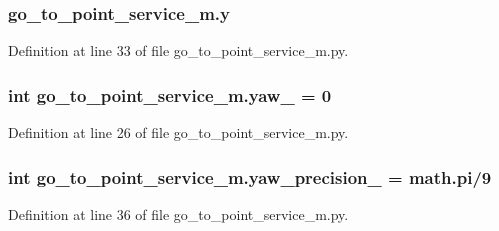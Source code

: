 \subsubsection[{\texorpdfstring{y}{y}}]{\setlength{\rightskip}{0pt plus 5cm}go\+\_\+to\+\_\+point\+\_\+service\+\_\+m.\+y}\hypertarget{namespacego__to__point__service__m_a8a0df04be6cfa44113ee26eefbe11f95}{}\label{namespacego__to__point__service__m_a8a0df04be6cfa44113ee26eefbe11f95}


Definition at line 33 of file go\+\_\+to\+\_\+point\+\_\+service\+\_\+m.\+py.

\subsubsection[{\texorpdfstring{yaw\+\_\+}{yaw_}}]{\setlength{\rightskip}{0pt plus 5cm}int go\+\_\+to\+\_\+point\+\_\+service\+\_\+m.\+yaw\+\_\+ = 0}\hypertarget{namespacego__to__point__service__m_ab1e499009bca0d4c9ea5e8954aa37797}{}\label{namespacego__to__point__service__m_ab1e499009bca0d4c9ea5e8954aa37797}


Definition at line 26 of file go\+\_\+to\+\_\+point\+\_\+service\+\_\+m.\+py.

\subsubsection[{\texorpdfstring{yaw\+\_\+precision\+\_\+}{yaw_precision_}}]{\setlength{\rightskip}{0pt plus 5cm}int go\+\_\+to\+\_\+point\+\_\+service\+\_\+m.\+yaw\+\_\+precision\+\_\+ = math.\+pi/9}\hypertarget{namespacego__to__point__service__m_af47f1354626111fc63115c06276ae41d}{}\label{namespacego__to__point__service__m_af47f1354626111fc63115c06276ae41d}


Definition at line 36 of file go\+\_\+to\+\_\+point\+\_\+service\+\_\+m.\+py.

